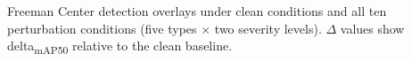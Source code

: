 \caption{Freeman Center detection overlays under clean conditions and all ten perturbation conditions (five types $\times$ two severity levels). $\Delta$ values show delta\textsubscript{mAP50} relative to the clean baseline.}\label{fig:perturbation-strip-freeman}
